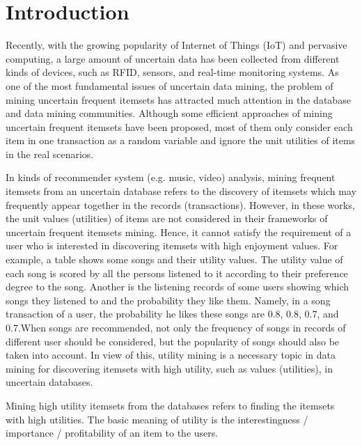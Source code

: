\documentclass[conference]{IEEEtran}
\begin{document}
\section{Introduction}
Recently, with the growing popularity of Internet of Things (IoT) and pervasive computing, a large amount of uncertain data has been collected from different kinds of devices, such as RFID, sensors, and real-time monitoring systems\cite{tong2015tracking,tong2015mining}. As one of the most fundamental issues of uncertain data mining, the problem of mining uncertain frequent itemsets has attracted much attention in the database and data mining communities\cite{chui2007mining,aggarwal2009frequent,tong2012discovering,bernecker2009probabilistic,tong2012ufimt}. Although some efficient approaches of mining uncertain frequent itemsets have been proposed\cite{tong2012mining}, most of them only consider each item in one transaction as a random variable and ignore the unit utilities of items in the real scenarios.

In kinds of recommender system (e.g. music, video) analysis, mining frequent itemsets from an uncertain database refers to the discovery of itemsets which may frequently appear together in the records (transactions). However, in these works, the unit values (utilities) of items are not considered in their frameworks of uncertain frequent itemsets mining. Hence, it cannot satisfy the requirement of a user who is interested in discovering itemsets with high enjoyment values. For example, a table shows some songs and their utility values. The utility value of each song is scored by all the persons listened to it according to their preference degree to the song. Another is the listening records of some users showing which songs they listened to and the probability they like them. Namely, in a song transaction of a user, the probability he likes these songs are 0.8, 0.8, 0.7, and 0.7.When songs are recommended, not only the frequency of songs in records of different user should be considered, but the popularity of songs should also be taken into account. In view of this, utility mining is a necessary topic in data mining for discovering itemsets with high utility, such as values (utilities), in uncertain databases.

Mining high utility itemsets from the databases refers to finding the itemsets with high utilities\cite{chan2003mining,ahmed2009efficient,tseng2010up}. The basic meaning of utility is the interestingness / importance / profitability of an item to the users.
\end{document}
